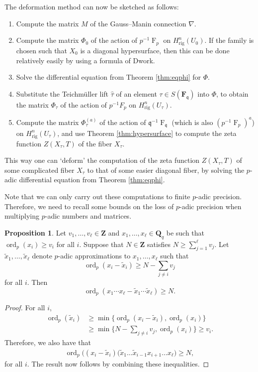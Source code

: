 \documentclass[a4paper,11pt]{article}
\numberwithin{equation}{section}
\newcommand{\ZZ}{\mathbf{Z}} %
\newcommand{\FF}{\mathbf{F}} %
\DeclareMathOperator{\ord}{ord}          %
\DeclareMathOperator{\Frob}{F}           %
\providecommand{\Hrig}{H_{\text{rig}}}  %
\theoremstyle{definition}
\newtheorem{prop}[thm]{Proposition}
\begin{document}
The deformation method can now be sketched as follows:
\begin{enumerate}
\item Compute the matrix $M$ of the Gauss--Manin connection $\nabla$.
\item Compute the matrix $\Phi_0$ of the action of $p^{-1}\Frob_p$ on $\Hrig^n(U_0)$. If the
family is chosen such that $X_0$ is a diagonal hypersurface, then this can be done relatively
easily by using a formula of Dwork.
\item Solve the differential equation from Theorem \ref{thm:eqphi} for $\Phi$.
\item Substitute the Teichm\"uller lift $\hat{\tau}$ of an element $\tau \in S(\FF_{\mathfrak{q}})$
into $\Phi$,
to obtain the matrix $\Phi_{\tau}$ of the action of $p^{-1}F_p$ on $\Hrig^n(U_{\tau})$.
\item Compute the matrix $\Phi_{\tau}^{(a)}$ of the action of $\mathfrak{q}^{-1} \Frob_{\mathfrak{q}}$ (which is also $(p^{-1}\Frob_p)^a$) 
on $\Hrig^n(U_{\tau})$, and use Theorem \ref{thm:hypersurface} to compute the zeta function $Z(X_{\tau},T)$
of the fiber $X_{\tau}$.
\end{enumerate}

This way one can `deform' the computation of the zeta function $Z(X_{\tau},T)$ of some complicated fiber $X_{\tau}$
to that of some easier diagonal fiber, by solving the $p$-adic differential equation from Theorem \ref{thm:eqphi}.

Note that we can only carry out these computations to finite $p$-adic precision. Therefore, we need to recall 
some bounds on the loss of $p$-adic precision when multiplying $p$-adic numbers and matrices. 

\begin{prop} \label{prop:productval}
Let $v_1,\ldots,v_{\ell} \in \ZZ$ and $x_1, \dotsc, x_{\ell} \in \mathbf{Q}_q$  
be such that $\ord_p(x_i) \geq v_i$ for all $i$. Suppose that $N \in \ZZ$ satisfies 
$N \geq \sum_{j=1}^{\ell} v_j$. Let $\tilde{x}_1, \dotsc, \tilde{x}_{\ell}$ denote 
$p$-adic approximations to $x_1, \dotsc, x_{\ell}$ such that 
\[
\ord_p(x_i - \tilde{x}_i) \geq N - \sum_{j \neq i} v_j
\] 
for all $i$.  Then 
\begin{equation*}
\ord_p(x_1 \dotsm x_{\ell} - \tilde{x}_1 \dotsm \tilde{x}_{\ell}) \geq N.
\end{equation*}
\end{prop}

\begin{proof}
For all $i$,
\begin{align*}
\ord_p(\tilde{x}_i) &\geq \min \{ \ord_p(x_i-\tilde{x}_i), \ord_p(x_i) \} \\
                    &\geq \min \{ N- \sum_{j \neq i} v_j, \ord_p(x_i)\} \geq v_i.
\end{align*}
Therefore, we also have that
\begin{align*}
\ord_p \bigl( (x_{i}-\tilde{x}_{i})(\tilde{x}_1 \dotsc \tilde{x}_{i-1} x_{i+1} \dotsc x_{\ell} \bigr) \geq N,
\end{align*}
for all $i$. The result now follows by combining these inequalities.
\end{proof}
\end{document}
